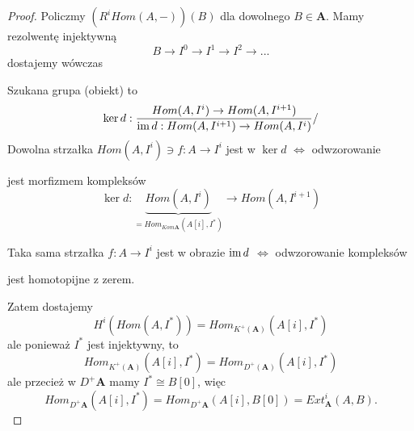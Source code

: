\begin{proof}
  Policzmy $(R^iHom(A, -))(B)$ dla dowolnego $B\in \mathbf{A}$. Mamy rezolwentę injektywną
  $$B\to I^0\to I^1\to I^2\to ...$$
  dostajemy wówczas
  \begin{center}\end{center}
  Szukana grupa (obiekt) to 
  $$\ker d:\frac{Hom(A, I^i)\to Hom(A, I^{i+1})}{\operatorname{im} d:Hom(A, I^{i+1})\to Hom(A, I^i)}/$$
  Dowolna strzałka $Hom(A, I^i)\ni f:A\to I^i$ jest w $\ker d$ $\iff$ odwzorowanie
  \begin{center}\end{center}
  jest morfizmem kompleksów
  $$\ker d:\underbrace{Hom(A, I^i)}_{=Hom_{Kom\mathbf{A}}(A[i], I^*)}\to Hom(A, I^{i+1})$$

  Taka sama strzałka $f:A\to I^i$ jest w obrazie $\operatorname{im} d$ $\iff$ odwzorowanie kompleksów
  \begin{center}\end{center}
  jest homotopijne z zerem.

  Zatem dostajemy
  $$H^i(Hom(A, I^*))=Hom_{K^+(\mathbf{A})}(A[i], I^*)$$
  ale ponieważ $I^*$ jest injektywny, to
  $$Hom_{K^+(\mathbf{A})}(A[i], I^*)=Hom_{D^+(\mathbf{A})}(A[i], I^*)$$
  ale przecież w  $D^+\mathbf{A}$ mamy $I^*\cong B[0]$, więc
  $$Hom_{D^+\mathbf{A}}(A[i], I^*)=Hom_{D^+\mathbf{A}}(A[i], B[0])=Ext^i_{\mathbf{A}}(A, B).$$
\end{proof}

